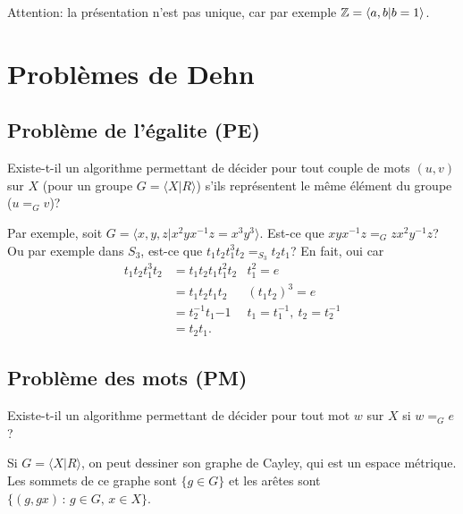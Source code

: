     Attention: la présentation n'est pas unique, car par exemple $\mathbb{Z} = \langle a, b | b = 1 \rangle$.

  \section{Problèmes de Dehn}

    \subsection{Problème de l'égalite (PE)}

      Existe-t-il un algorithme permettant de décider pour tout couple de mots $(u,v)$ sur $X$ (pour un groupe
      $G = \langle X | R \rangle$) s'ils représentent le même élément du groupe ($u =_G v$)?

      Par exemple, soit $G = \langle x,y,z |  x^2yx^{-1}z = x^3y^3\rangle$. Est-ce que $xyx^{-1}z =_G
      zx^2y^{-1}z$? Ou par exemple dans $S_3$, est-ce que $t_1t_2t_1^3t_2 =_{S_3} t_2t_1$? En fait, oui car
      \begin{align*}
        t_1t_2t_1^3t_2 &= t_1t_2t_1t_1^2t_2 & t_1^2 = e\\
        &= t_1t_2t_1t_2 & (t_1t_2)^3 = e\\
        &= t_2^{-1}t_1{-1} & t_1 = t_1^{-1},\ t_2 = t_2^{-1}\\
        &= t_2t_1.
      \end{align*}

    \subsection{Problème des mots (PM)}

      Existe-t-il un algorithme permettant de décider pour tout mot $w$ sur $X$ si $w =_G e$?

      Si $G = \langle X | R \rangle$, on peut dessiner son graphe de Cayley, qui est un espace métrique. Les
      sommets de ce graphe sont $\{g \in G\}$ et les arêtes sont $\{(g, gx)\, :\, g \in G,\, x \in X\}$.

